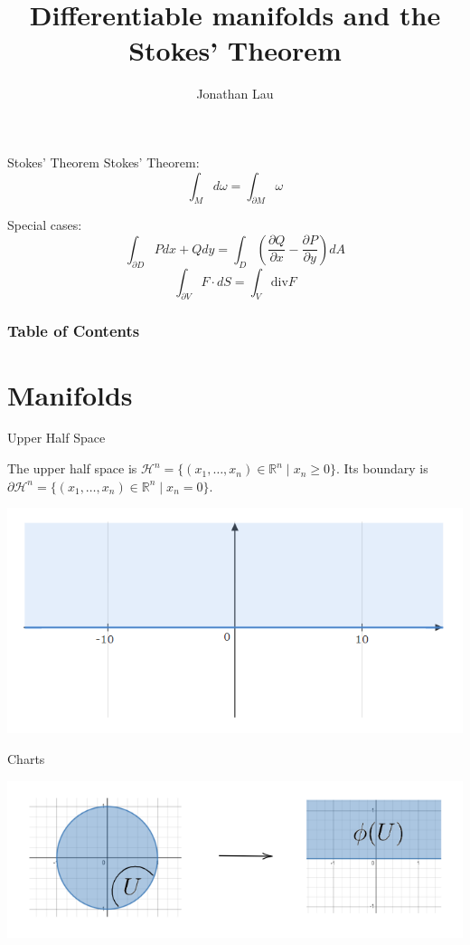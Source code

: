 \documentclass[9pt]{beamer}
\title[Differentiable manifolds and the Stokes' Theorem]
{Differentiable manifolds and the Stokes' Theorem}
\author[Jonathan Lau] %
{Jonathan Lau}
\begin{document}
	
\frame{\titlepage}
	
\begin{frame}{Stokes' Theorem}
    Stokes' Theorem:\[\int_Md\omega = \int_{\partial M} \omega\]

    Special cases: \[\int_{\partial D} Pdx+Qdy = \int_D \left(\frac{\partial Q}{\partial x}-\frac{\partial P}{\partial y}\right) dA\]
    \[\int_{\partial V}  F\cdot dS = \int_V \text{div} F\]
\end{frame}

\begin{frame}
	\frametitle{Table of Contents}
	\tableofcontents
\end{frame}

\section{Manifolds}


\begin{frame}{Upper Half Space}
    \begin{block}{}
        The upper half space is $\mathcal{H}^n=\{(x_1, \dots, x_n)\in \mathbb{R}^n\mid x_n \geq 0\}$. Its boundary is $\partial \mathcal{H}^n = \{(x_1, \dots, x_n)\in \mathbb{R}^n\mid x_n = 0\}$.
    \end{block}
    \begin{center}
        
        \includegraphics[scale=0.6]{upper_half.PNG}
    \end{center}

\end{frame}
\begin{frame}{Charts}

    \includegraphics[scale=0.8]{chart.PNG}
    
\end{frame}
\end{document}
